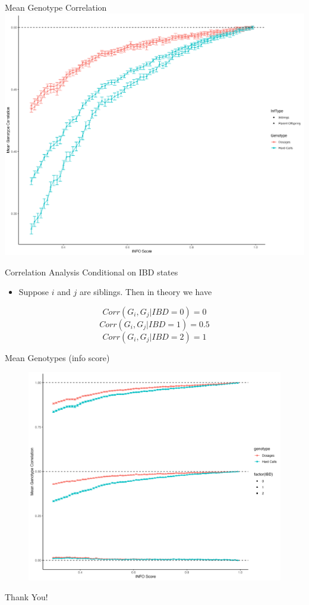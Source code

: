 \documentclass{beamer}
\begin{document}
\begin{frame}{Mean Genotype Correlation}
      \centering
      \includegraphics[width=.83\textwidth]{fig/mean_gt_corr_v2.png}
\end{frame}

\begin{frame}{Correlation Analysis Conditional on IBD states}
      \begin{itemize}
            \item Suppose \(i\) and \(j\) are siblings. Then in theory we have
      \end{itemize}
      \[
            Corr(G_i, G_j | IBD = 0) = 0
      \]
      \[
            Corr(G_i, G_j | IBD = 1) = 0.5
      \]
      \[
            Corr(G_i, G_j | IBD = 2) = 1
      \]
\end{frame}

\begin{frame}{Mean Genotypes (info score)}
      \begin{figure}
            \includegraphics[width= .80\textwidth]{fig/mean_gt_by_ibd.png}
      \end{figure}
\end{frame}

\begin{frame}[plain]

      \huge{Thank You!}

\end{frame}
\end{document}
